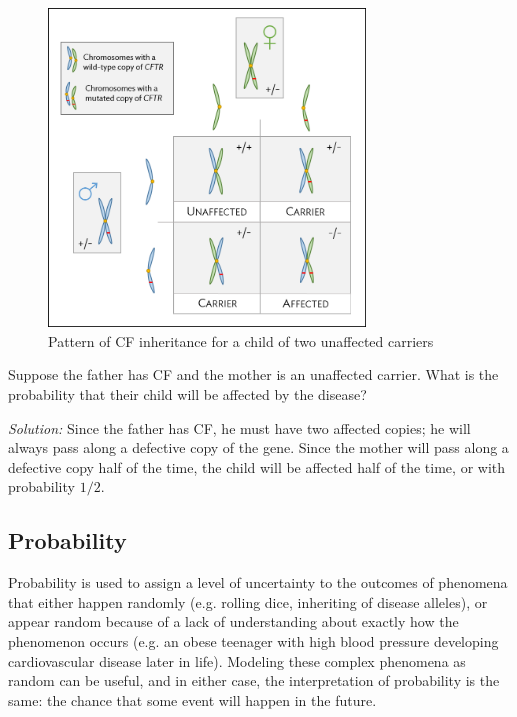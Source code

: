 \begin{figure}
	\centering
	\includegraphics[width= 0.75\textwidth]{ch_probability_oi_biostat/figures/cfInheritance/cfInheritance.png}
	\caption{Pattern of CF inheritance for a child of two unaffected carriers}
	\label{fig:cfInheritance}
\end{figure}

\begin{exercise}
Suppose the father has CF and the mother is an unaffected carrier. What is the probability that their child will be affected by the disease?

\textit{Solution:}  Since the father has CF, he must have two affected copies; he will always pass along a defective copy of the gene.  Since the mother will pass along a defective copy half of the time, the child will be affected half of the time, or with probability $1/2$.

\end{exercise}

\subsection{Probability}


Probability is used to assign a level of uncertainty to the outcomes of phenomena that either happen randomly (e.g. rolling dice, inheriting of disease alleles), or appear random because of a lack of understanding about exactly how the phenomenon occurs (e.g. an obese teenager with high blood pressure developing cardiovascular disease later in life). Modeling these complex phenomena as random can be useful, and in either case, the interpretation of probability is the same: the chance that some event will happen in the future.

